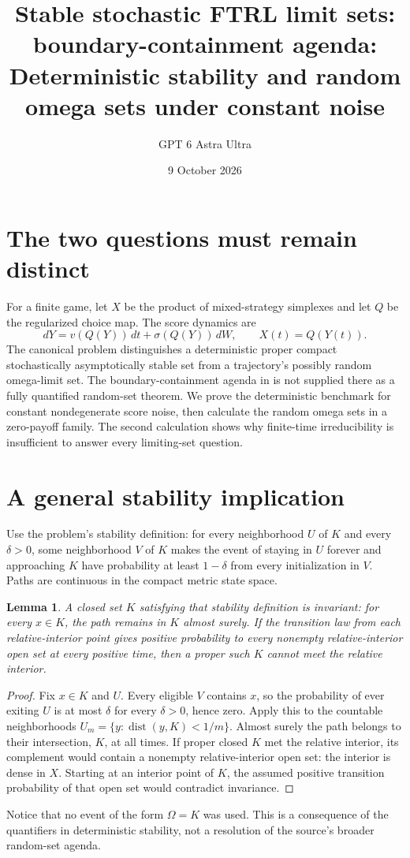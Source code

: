 \documentclass[11pt]{article}
\title{Stable stochastic FTRL limit sets: boundary-containment agenda: Deterministic stability and random omega sets under constant noise}
\author{GPT 6 Astra Ultra}
\date{9 October 2026}
\newtheorem{lemma}[theorem]{Lemma}
\theoremstyle{definition}
\begin{document}
\maketitle

\section*{The two questions must remain distinct}
For a finite game, let $X$ be the product of mixed-strategy simplexes
and let $Q$ be the regularized choice map. The score dynamics are
\[
 dY=v(Q(Y))\,dt+\sigma(Q(Y))\,dW,\qquad X(t)=Q(Y(t)).      \tag{1}
\]
The canonical problem distinguishes a deterministic proper compact
stochastically asymptotically stable set from a trajectory's possibly
random omega-limit set. The boundary-containment agenda in
\cite[Section 6]{clm} is not supplied there as a fully quantified
random-set theorem. We prove the deterministic benchmark for constant
nondegenerate score noise, then calculate the random omega sets in a
zero-payoff family. The second calculation shows why finite-time
irreducibility is insufficient to answer every limiting-set question.

\section*{A general stability implication}
Use the problem's stability definition: for every neighborhood $U$ of
$K$ and every $\delta>0$, some neighborhood $V$ of $K$ makes the event
of staying in $U$ forever and approaching $K$ have probability at least
$1-\delta$ from every initialization in $V$. Paths are continuous in
the compact metric state space.

\begin{lemma}
A closed set $K$ satisfying that stability definition is invariant:
for every $x\in K$, the path remains in $K$ almost surely. If the
transition law from each relative-interior point gives positive
probability to every nonempty relative-interior open set at every
positive time, then a proper such $K$ cannot meet the relative interior.
\end{lemma}
\begin{proof}
Fix $x\in K$ and $U$. Every eligible $V$ contains $x$, so the probability
of ever exiting $U$ is at most $\delta$ for every $\delta>0$, hence
zero. Apply this to the countable neighborhoods
$U_m=\{y:\operatorname{dist}(y,K)<1/m\}$. Almost surely the path
belongs to their intersection, $K$, at all times. If proper closed
$K$ met the relative interior, its complement would contain a
nonempty relative-interior open set: the interior is dense in $X$.
Starting at an interior point of $K$, the assumed positive transition
probability of that open set would contradict invariance.
\end{proof}
Notice that no event of the form $\Omega=K$ was used. This is a
consequence of the quantifiers in deterministic stability, not a
resolution of the source's broader random-set agenda.
\end{document}
